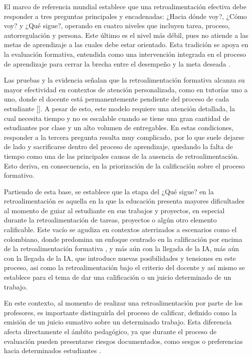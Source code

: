 \documentclass[letterpaper, 10 pt, conference]{ieeeconf}  %
\begin{document}
    El marco de referencia mundial establece que una retroalimentación efectiva debe responder a tres preguntas principales y encadenadas: ¿Hacia dónde voy?, ¿Cómo voy? y ¿Qué sigue?, operando en cuatro niveles que incluyen tarea, proceso, autorregulación y persona. Este último es el nivel más débil, pues no atiende a las metas de aprendizaje\cite{6} a las cuales debe estar orientado. Esta tradición se apoya en la evaluación formativa, entendida como una intervención integrada en el proceso de aprendizaje para cerrar la brecha entre el desempeño y la meta deseada \cite{7}.

    Las pruebas y la evidencia señalan que la retroalimentación formativa alcanza su mayor efectividad en contextos de atención personalizada, como en tutorías uno a uno, donde el docente está permanentemente pendiente del proceso de cada estudiante []. A pesar de esto, este modelo requiere una atención detallada, la cual necesita tiempo y no es escalable cuando se tiene una gran cantidad de estudiantes por clase y un alto volumen de entregables. En estas condiciones, responder a la tercera pregunta resulta muy complicado, por lo que suele dejarse de lado y sacrificarse dentro del proceso de aprendizaje, quedando la falta de tiempo como una de las principales causas de la ausencia de retroalimentación. Esto deriva, en consecuencia, en la priorización de la calificación sobre el proceso formativo. 
    
    Partiendo de esta base, se establece que la etapa del ¿Qué sigue? en la retroalimentación es aquella en la que la educación presenta mayores dificultades al momento de guiar al estudiante en sus trabajos y proyectos, en especial durante la retroalimentación de tareas, proyectos o algún otro elemento calificable. Este vacío se agudiza en contextos aterrizados a escenarios como el colombiano, donde predomina un enfoque centrado en la calificación por encima de la retroalimentación formativa \cite{8}, y más aún con la llegada de la IA, más aún con la llegada de la IA, que introduce nuevas posibilidades y tensiones en este proceso, asi como la retroalimentación bajo el criterio del docente y así mismo se establece para el tema de dar una calificación o un juicio determinado de un trabajo.

    En este contexto, al momento de realizar una retroalimentación por parte de los profesores, es importante distinguirla del proceso de calificar, definido como la emisión de un juicio sumativo sobre un determinado trabajo. Esta diferencia afecta directamente el ámbito pedagógico, ya que durante el proceso de evaluación pueden presentarse riesgos documentados, como sesgos o preferencias hacia determinados estudiantes \cite{9}.
\end{document}
